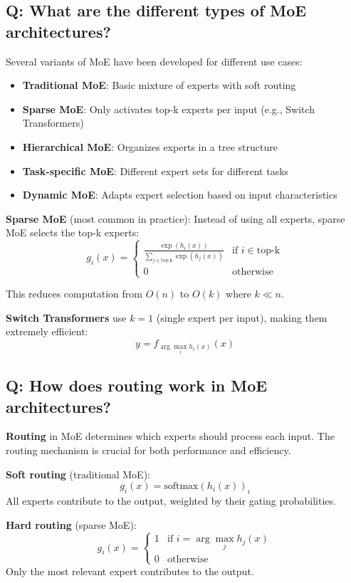 \subsection*{Q: What are the different types of MoE architectures?}
Several variants of MoE have been developed for different use cases:

\begin{itemize}
	\item \textbf{Traditional MoE}: Basic mixture of experts with soft routing
	\item \textbf{Sparse MoE}: Only activates top-k experts per input (e.g., Switch Transformers)
	\item \textbf{Hierarchical MoE}: Organizes experts in a tree structure
	\item \textbf{Task-specific MoE}: Different expert sets for different tasks
	\item \textbf{Dynamic MoE}: Adapts expert selection based on input characteristics
\end{itemize}

\textbf{Sparse MoE} (most common in practice):
Instead of using all experts, sparse MoE selects the top-k experts:
\[
	g_i(x) = \begin{cases}
		\frac{\exp(h_i(x))}{\sum_{j \in \text{top-k}} \exp(h_j(x))} & \text{if } i \in \text{top-k} \\
		0                                                           & \text{otherwise}
	\end{cases}
\]

This reduces computation from \(O(n)\) to \(O(k)\) where \(k \ll n\).

\textbf{Switch Transformers} use \(k=1\) (single expert per input), making them extremely efficient:
\[
	y = f_{\arg\max_i h_i(x)}(x)
\]

\subsection*{Q: How does routing work in MoE architectures?}
\textbf{Routing} in MoE determines which experts should process each input. The routing mechanism is crucial for both performance and efficiency.

\textbf{Soft routing} (traditional MoE):
\[
	g_i(x) = \text{softmax}(h_i(x))_i
\]
All experts contribute to the output, weighted by their gating probabilities.

\textbf{Hard routing} (sparse MoE):
\[
	g_i(x) = \begin{cases}
		1 & \text{if } i = \arg\max_j h_j(x) \\
		0 & \text{otherwise}
	\end{cases}
\]
Only the most relevant expert contributes to the output.

